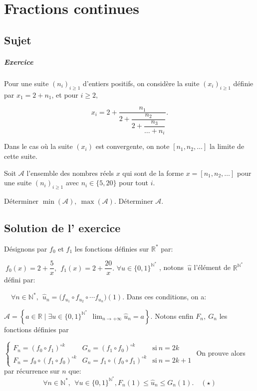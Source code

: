 \chapter{Fractions continues}
\section{Sujet}

\paragraph { Exercice}
Pour une suite $(n_i)_{i\geqslant1}$ d'entiers positifs, on considère la suite $(x_i)_{i\geqslant 1}$ définie par $x_1 =2 + n_1$, et pour $i\geqslant 2,$

$$x_i = 2 +\dfrac {n_1}{2+ \dfrac{n_2}{2+\dfrac {n_3}{\dots + n_i}}}.$$ 

Dans le cas où la suite $(x_i)$ est convergente, on note $[n_1,n_2, \dots ] $ la limite de cette suite.

Soit $\mathcal A$ l'ensemble des nombres réels $x$ qui sont de la forme $x = [n_1,n_2, \dots]$ pour une suite $(n_i)_{i\geqslant 1}$ avec $n_i \in \{5,20\}$ pour tout $i$.

Déterminer $\min (\mathcal A), \: \max (\mathcal A).$ Déterminer $\mathcal A.$

\section{Solution de l' exercice} %
 Désignons par $f_0$ et $f_1$ les fonctions définies sur $\mathbb R^*$ par: 
 
 $\: f_0(x) = 2 +\dfrac 5 x, \:\: f_1(x) = 2+ \dfrac {20}x.$ 
 $\forall u \in \{0,1\}^{\mathbb N^*} $ , notons  $\:\widehat u$   l'élément de $\mathbb R^{\mathbb N^*}$ défini par:
 
 $\quad \forall n \in \mathbb N^*, \:\: \widehat u_n =\Big(f_{u_1} \circ f_{u_2}\circ \cdots f_{u_n}\Big ) (1).$ 
 Dans ces conditions, on a:  
 
 $ \mathcal A= \left\{a \in \mathbb R \mid \exists u \in \{ 0,1\}^{\mathbb N^* }\:\: \displaystyle \lim_{n \to + \infty} \widehat u_n = a \right \}.$ 
Notons enfin $F_n,\:G_n$ les fonctions définies par 

$\left\{\begin{array}{lll} F_n = (f_0 \circ f_1)^{\circ k}& G_n = (f_1 \circ f_0) ^{\circ k} & \text{si} \: n=2k \\ F_n =f_0\circ (f_1\circ f_0)^{\circ k} & G_n = f_1 \circ ( f_0 \circ f_1)^{\circ k} & \text{si} \: n =2k+1 \end{array} \right. $
On prouve alors par récurrence sur $n$ que:  $$\forall n \in \mathbb N^*,\:\: \forall u \in \{0,1\} ^{\mathbb N^*},  F_n(1) \leqslant \widehat u_n \leqslant G_n(1). \quad (\star)$$  

